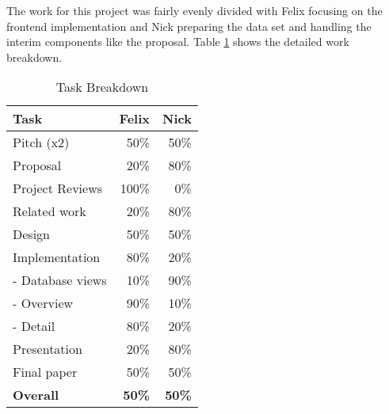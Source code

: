 \documentclass[../manifest.tex]{subfiles}
\begin{document}
The work for this project was fairly evenly divided with Felix focusing on the frontend implementation and Nick preparing the data set and handling the interim components like the proposal. Table \ref{tab:schedule} shows the detailed work breakdown.

\begin{table}[!thb]
  \caption{Task Breakdown}
  \label{tab:schedule}
  \begin{tabular*}{\columnwidth}{ l r r }
    \hline
    \textbf{Task} & \textbf{Felix} & \textbf{Nick} \\ %
    \hline
    Pitch (x2)                       &  50\% &  50\% \\ %
    Proposal                         &  20\% &  80\%  \\ %
    Project Reviews                  & 100\% &   0\% \\ %
    Related work                     &  20\% &   80\% \\ %
    Design                           &  50\% &   50\% \\
    Implementation                   &  80\% &  20\% \\ %
     - Database views                &  10\% &  90\% \\ %
     - Overview                      &  90\% &  10\% \\ %
     - Detail                        &  80\% &  20\% \\ %
    Presentation                     &  20\% &  80\% \\ %
    Final paper                      &  50\% &  50\% \\ %
    \hline
    \textbf{Overall}                 &  \textbf{50\%} &  \textbf{50\%} \\
    \hline
  \end{tabular*}
\end{table}
\end{document}

